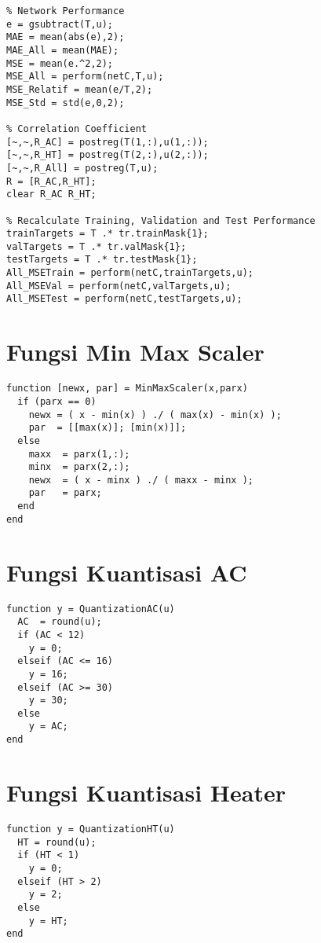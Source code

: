 \begin{lstlisting}
% Network Performance
e = gsubtract(T,u);
MAE = mean(abs(e),2);
MAE_All = mean(MAE);
MSE = mean(e.^2,2);
MSE_All = perform(netC,T,u);
MSE_Relatif = mean(e/T,2);
MSE_Std = std(e,0,2);

% Correlation Coefficient
[~,~,R_AC] = postreg(T(1,:),u(1,:));
[~,~,R_HT] = postreg(T(2,:),u(2,:));
[~,~,R_All] = postreg(T,u);
R = [R_AC,R_HT];
clear R_AC R_HT;

% Recalculate Training, Validation and Test Performance
trainTargets = T .* tr.trainMask{1};
valTargets = T .* tr.valMask{1};
testTargets = T .* tr.testMask{1};
All_MSETrain = perform(netC,trainTargets,u);
All_MSEVal = perform(netC,valTargets,u);
All_MSETest = perform(netC,testTargets,u);
\end{lstlisting}
\vspace{1em}

\section{Fungsi Min Max Scaler}
\begin{lstlisting}
function [newx, par] = MinMaxScaler(x,parx)
  if (parx == 0)
    newx = ( x - min(x) ) ./ ( max(x) - min(x) );
    par  = [[max(x)]; [min(x)]];
  else
    maxx  = parx(1,:);
    minx  = parx(2,:);
    newx  = ( x - minx ) ./ ( maxx - minx );
    par   = parx;
  end
end
\end{lstlisting}
\vspace{1em}

\section{Fungsi Kuantisasi AC}
\begin{lstlisting}
function y = QuantizationAC(u)
  AC  = round(u);
  if (AC < 12)
    y = 0;
  elseif (AC <= 16)
    y = 16;
  elseif (AC >= 30)
    y = 30;
  else
    y = AC;
end
\end{lstlisting}
\vspace{1em}

\section{Fungsi Kuantisasi Heater}
\begin{lstlisting}
function y = QuantizationHT(u)
  HT = round(u);
  if (HT < 1)
    y = 0;
  elseif (HT > 2)
    y = 2;
  else
    y = HT;
end
\end{lstlisting}
\vspace{1em}

